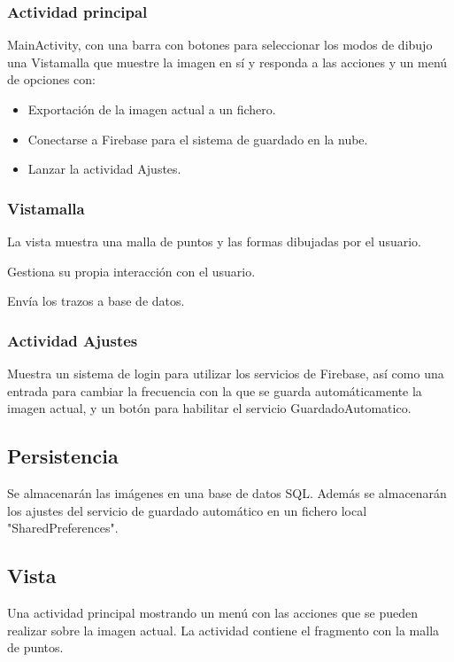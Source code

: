 \documentclass[a4paper,openright,12pt]{article}
\begin{document}
\subsubsection{Actividad principal}
MainActivity, con una barra con botones para seleccionar los modos de dibujo una Vistamalla que muestre la imagen en sí y responda a las acciones y un menú de opciones con:
\begin{itemize}
	\item Exportación de la imagen actual a un fichero.
    \item Conectarse a Firebase para el sistema de guardado en la nube.
    \item Lanzar la actividad Ajustes.
\end{itemize}

\subsubsection{Vistamalla}
La vista muestra una malla de puntos y las formas dibujadas por el usuario.

Gestiona su propia interacción con el usuario.

Envía los trazos a base de datos.

\subsubsection{Actividad Ajustes}
Muestra un sistema de login para utilizar los servicios de Firebase, así como una entrada para cambiar la frecuencia con la que se guarda automáticamente la imagen actual, y un botón para habilitar el servicio GuardadoAutomatico.


\subsection{Persistencia}
Se almacenarán las imágenes en una base de datos SQL. Además se almacenarán los ajustes del servicio de guardado automático en un fichero local "SharedPreferences".


\subsection{Vista}
Una actividad principal mostrando un menú con las acciones que se pueden realizar sobre la imagen actual. La actividad contiene el fragmento con la malla de puntos.
\end{document}
